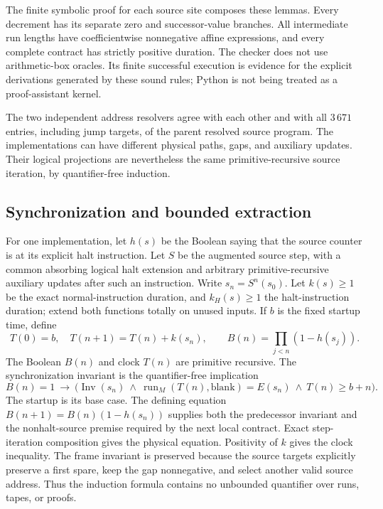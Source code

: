 The finite symbolic proof for each source site composes these lemmas.
Every decrement has its separate zero and successor-value branches.
All intermediate run lengths have coefficientwise nonnegative affine
expressions, and every complete contract has strictly positive duration.
The checker does not use arithmetic-box oracles.  Its finite successful
execution is evidence for the explicit derivations generated by these
sound rules; Python is not being treated as a proof-assistant kernel.

The two independent address resolvers agree with each other and with all
$3\,671$ entries, including jump targets, of the parent resolved source
program.  The implementations can have different physical paths, gaps,
and auxiliary updates.  Their logical projections are nevertheless the
same primitive-recursive source iteration, by quantifier-free induction.

\subsection{Synchronization and bounded extraction}

For one implementation, let $h(s)$ be the Boolean saying that the source
counter is at its explicit halt instruction.  Let $S$ be the augmented
source step, with a common absorbing logical halt extension and arbitrary
primitive-recursive auxiliary updates after such an instruction.  Write $s_n=S^n(s_0)$.  Let $k(s)\ge1$ be the exact
normal-instruction duration, and $k_H(s)\ge1$ the halt-instruction duration;
extend both functions totally on unused inputs.  If $b$ is the fixed
startup time, define
\[
 T(0)=b,\quad T(n+1)=T(n)+k(s_n),\qquad
 B(n)=\prod_{j<n}(1-h(s_j)).
\]
The Boolean $B(n)$ and clock $T(n)$ are primitive recursive.
The synchronization invariant is the quantifier-free implication
\[
 B(n)=1\ \longrightarrow\
 \bigl(\operatorname{Inv}(s_n)\ \wedge\
   \operatorname{run}_M(T(n),\mathrm{blank})=E(s_n)
   \ \wedge\ T(n)\ge b+n\bigr).
 \tag{S$_H$}\label{lcax:eq:source-synchronization}
\]
The startup is its base case.  The defining equation
$B(n+1)=B(n)(1-h(s_n))$ supplies both the predecessor invariant and the
nonhalt-source premise required by the next local contract.  Exact
step-iteration composition gives the physical equation.  Positivity of
$k$ gives the clock inequality.  The frame invariant is preserved because
the source targets explicitly preserve a first spare, keep the gap
nonnegative, and select another valid source address.  Thus the induction
formula contains no unbounded quantifier over runs, tapes, or proofs.

